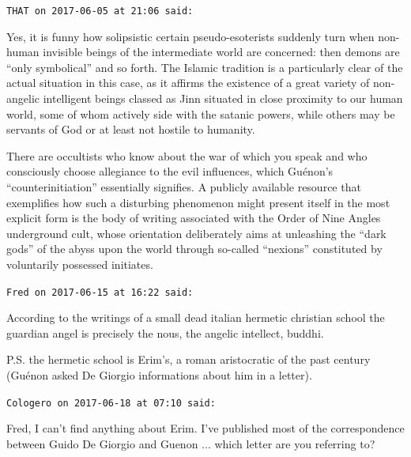 \begin{footnotesize}
\begin{sffamily}
\texttt{THAT on 2017-06-05 at 21:06 said:}

Yes, it is funny how solipsistic certain pseudo-esoterists suddenly turn when non-human invisible beings of the intermediate world are concerned: then demons are ``only symbolical'' and so forth. The Islamic tradition is a particularly clear of the actual situation in this case, as it affirms the existence of a great variety of non-angelic intelligent beings classed as Jinn situated in close proximity to our human world, some of whom actively side with the satanic powers, while others may be servants of God or at least not hostile to humanity.

There are occultists who know about the war of which you speak and who consciously choose allegiance to the evil influences, which Guénon's ``counterinitiation'' essentially signifies. A publicly available resource that exemplifies how such a disturbing phenomenon might present itself in the most explicit form is the body of writing associated with the Order of Nine Angles underground cult, whose orientation deliberately aims at unleashing the ``dark gods'' of the abyss upon the world through so-called ``nexions'' constituted by voluntarily possessed initiates.

\hfill

\texttt{Fred on 2017-06-15 at 16:22 said:}

According to the writings of a small dead italian hermetic christian school the guardian angel is precisely the nous, the angelic intellect, buddhi.

P.S. the hermetic school is Erim's, a roman aristocratic of the past century (Guénon asked De Giorgio informations about him in a letter).

\hfill

\texttt{Cologero on 2017-06-18 at 07:10 said:}

Fred, I can't find anything about Erim. I've published most of the correspondence between Guido De Giorgio and Guenon ... which letter are you referring to?

\end{sffamily}
\end{footnotesize}

